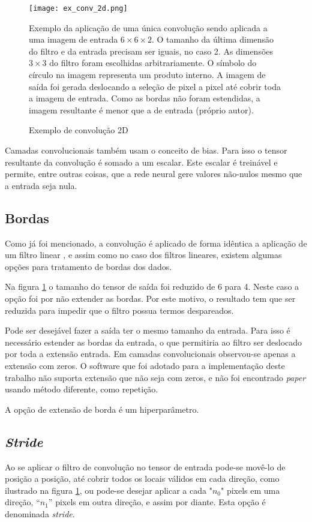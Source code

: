 \begin{figure}[!htb]
	\centering
	\texttt{[image: ex\_conv\_2d.png]}
	\caption{Exemplo de convolução 2D}
	\label{fig:ex_conv_2d}
	Exemplo da aplicação de uma única convolução sendo aplicada a uma imagem de
	entrada $6 \times 6 \times 2$. O tamanho da última dimensão do filtro e
	da entrada precisam ser iguais, no caso 2. As dimensões $3 \times 3$ do
	filtro foram escolhidas arbitrariamente. O símbolo do círculo na imagem
	representa um produto interno. A imagem de saída foi gerada deslocando
	a seleção de pixel a pixel até cobrir toda a
	imagem de entrada. Como as bordas não foram estendidas, a imagem
	resultante é menor que a de entrada (próprio autor).
\end{figure}

Camadas convolucionais também usam o conceito de bias. Para isso o tensor
resultante da convolução é somado a um escalar. Este escalar é treinável e
permite, entre outras coisas, que a rede neural gere valores não-nulos mesmo que
a entrada seja nula.

\subsection{Bordas} \label{ses:bordas}
Como já foi mencionado, a convolução é aplicado de forma idêntica a aplicação
de um filtro linear \cite{gonzalezwoods200708}, e assim como no caso dos
filtros lineares, existem algumas opções para tratamento de bordas dos dados.

Na figura \ref{fig:ex_conv_2d} o tamanho do tensor de saída foi reduzido
de 6 para 4. Neste caso a opção foi por não extender as bordas. Por
este motivo, o resultado tem que ser reduzida para impedir que o filtro
possua termos despareados.

Pode ser
desejável fazer a saída ter o mesmo tamanho da entrada. Para isso é necessário
estender as bordas da entrada, o que permitiria ao filtro ser deslocado por
toda a extensão entrada. Em camadas convolucionais observou-se apenas a
extensão com zeros. O software que foi adotado para a implementação deste
trabalho não suporta extensão que não seja com zeros, e não foi encontrado
\emph{paper} usando método diferente, como repetição.

A opção de extensão de borda é um hiperparâmetro.

\subsection{\emph{Stride}}
Ao se aplicar o filtro de convolução no tensor de entrada pode-se movê-lo de
posição a posição, até cobrir todos os locais válidos em cada direção, como
ilustrado na figura \ref{fig:ex_conv_2d}, ou pode-se desejar aplicar a cada
"$n_0$" pixels em uma direção, “$n_1$” pixels em outra direção, e assim por diante.
Esta opção é denominada \emph{stride}.

